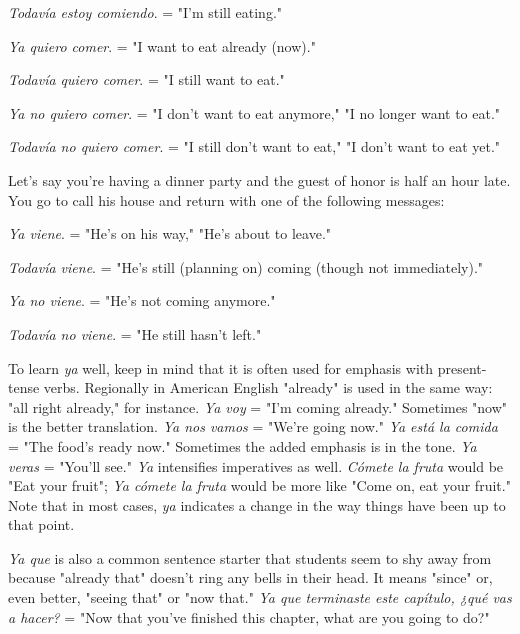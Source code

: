 \indu \emph{Todavía estoy comiendo}. = "I'm still eating."

\indu \emph{Ya quiero comer}. = "I want to eat already (now)."

\indu \emph{Todavía quiero comer}. = "I still want to eat."

\indu \emph{Ya no quiero comer}. = "I don't want to eat anymore," "I no longer want to eat."

\indu \emph{Todavía no quiero comer}. = "I still don't want to eat," "I don't want to eat yet."

\bsk

Let's say you're having a dinner party and the guest of honor is half an
hour late. You go to call his house and return with one of the following
messages:

\bsk

\indu \emph{Ya viene}. = "He's on his way," "He's about to leave."

\indu \emph{Todavía viene}. = "He's still (planning on) coming (though not immediately)."

\indu \emph{Ya no viene}. = "He's not coming anymore."

\indu \emph{Todavía no viene}. = "He still hasn't left."

\bsk

To learn \emph{ya} well, keep in mind that it is often used for emphasis with
present-tense verbs. Regionally in American English "already" is used
in the same way: "all right already," for instance. \emph{Ya voy} = "I'm coming already." Sometimes "now" is the better translation. \emph{Ya nos vamos}
= "We're going now." \emph{Ya está la comida} = "The food's ready now."
Sometimes the added emphasis is in the tone. \emph{Ya veras} = "You'll see."
\emph{Ya} intensifies imperatives as well. \emph{Cómete la fruta} would be "Eat your
fruit"; \emph{Ya cómete la fruta} would be more like "Come on, eat your
fruit." Note that in most cases, \emph{ya} indicates a change in the way things
have been up to that point.

\emph{Ya que} is also a common sentence starter that students seem
to shy away from because "already that" doesn't ring any bells in their
head. It means "since" or, even better, "seeing that" or "now that." \emph{Ya
que terminaste este capítulo, ¿qué vas a hacer?} = "Now that you've
finished this chapter, what are you going to do?"

